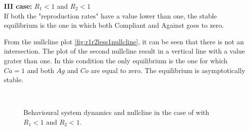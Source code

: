 \textbf{III case:} $R_1 <1$ and $R_2<1$ \\
If both the "reproduction rates" have a value lower than one, the stable equilibrium is the one in which both Compliant and Against goes to zero. 

From the nullcline plot \ref{fig:r1r2less1nullcline}, it can be seen that there is not an intersection. The plot of the second nullcline result in a vertical line with a value grater than one. In this condition the only equilibrium is the one for which $Ca = 1$ and both $Ag$ and $Co$ are equal to zero. 
The equilibrium is asymptotically stable. 
\begin{figure}[h]
	\centering
	 \quad
	 \\
	\caption[Behavioural model third case]{Behavioural system dynamics and nullcline in the case of   with $R_1 < 1$ and $R_2 < 1$.}
	\label{fig:r1r2less1dyn}
\end{figure}


